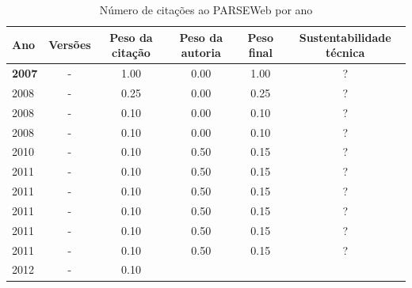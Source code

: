 \begin{table}[H]
\caption{Número de citações ao PARSEWeb por ano}
\centering
\begin{tabular}{| l | c | c | c | c | c |}
  \hline
  Ano & Versões & Peso da citação & Peso da autoria & Peso final & Sustentabilidade técnica \\
  \hline
            {\bf 2007}
          &
          -
          &
          1.00
          &
          0.00
          &
            {\color{blue} 1.00}
          &
          ?
          \\
\hline
            2008
          &
          -
          &
          0.25
          &
          0.00
          &
            {\color{red} 0.25}
          &
          ?
          \\
            2008
          &
          -
          &
          0.10
          &
          0.00
          &
            {\color{red} 0.10}
          &
          ?
          \\
            2008
          &
          -
          &
          0.10
          &
          0.00
          &
            {\color{red} 0.10}
          &
          ?
          \\
\hline
            2010
          &
          -
          &
          0.10
          &
          0.50
          &
            {\color{red} 0.15}
          &
          ?
          \\
\hline
            2011
          &
          -
          &
          0.10
          &
          0.50
          &
            {\color{red} 0.15}
          &
          ?
          \\
            2011
          &
          -
          &
          0.10
          &
          0.50
          &
            {\color{red} 0.15}
          &
          ?
          \\
            2011
          &
          -
          &
          0.10
          &
          0.50
          &
            {\color{red} 0.15}
          &
          ?
          \\
            2011
          &
          -
          &
          0.10
          &
          0.50
          &
            {\color{red} 0.15}
          &
          ?
          \\
            2011
          &
          -
          &
          0.10
          &
          0.50
          &
            {\color{red} 0.15}
          &
          ?
          \\
\hline
            2012
          &
          -
          &
          0.10

\end{tabular}
\end{table}
